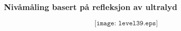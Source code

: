 \documentclass[aspectratio=169,xcolor=dvipsnames]{beamer}
\begin{document}
%
%
%
%
%
%
\begin{frame}
	\frametitle{Nivåmåling basert på refleksjon av ultralyd}

$$\texttt{[image: level39.eps]}$$
\end{frame}
%
%
\end{document}
